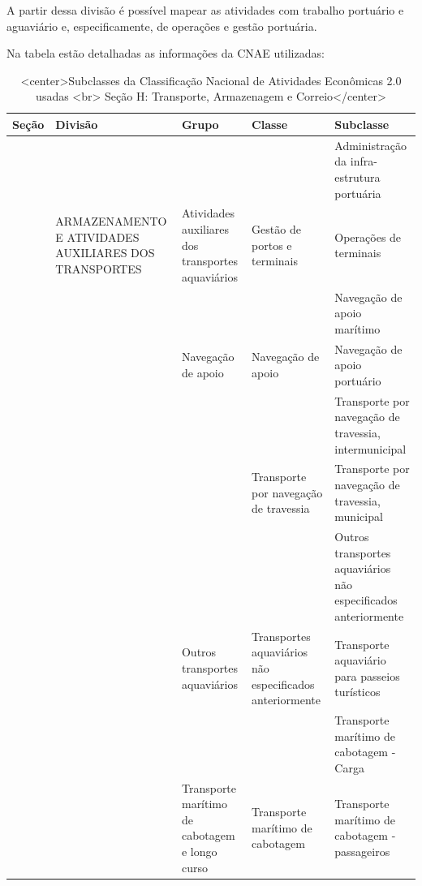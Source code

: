 \documentclass[
]{article}
\begin{document}
A partir dessa divisão é possível mapear as atividades com trabalho
portuário e aguaviário e, especificamente, de operações e gestão
portuária.

Na tabela estão detalhadas as informações da CNAE utilizadas:

\begin{table}

\caption{\label{tab:tabela1}<center>Subclasses da Classificação Nacional de Atividades Econômicas 2.0 usadas <br> Seção H: Transporte, Armazenagem e Correio</center>}
\centering
\begin{tabular}[t]{>{}lllll}
\toprule
Seção & Divisão & Grupo & Classe & Subclasse\\
\midrule
 &  &  &  & Administração da infra-estrutura portuária\\
\cmidrule{5-5}
 & \multirow[t]{-2}{*}{\raggedright\arraybackslash ARMAZENAMENTO E ATIVIDADES AUXILIARES DOS TRANSPORTES} & \multirow[t]{-2}{*}{\raggedright\arraybackslash Atividades auxiliares dos transportes aquaviários} & \multirow[t]{-2}{*}{\raggedright\arraybackslash Gestão de portos e terminais} & Operações de terminais\\
\cmidrule{2-5}
 &  &  &  & Navegação de apoio marítimo\\
\cmidrule{5-5}
 &  & \multirow[t]{-2}{*}{\raggedright\arraybackslash Navegação de apoio} & \multirow[t]{-2}{*}{\raggedright\arraybackslash Navegação de apoio} & Navegação de apoio portuário\\
\cmidrule{3-5}
 &  &  &  & Transporte por navegação de travessia, intermunicipal\\
\cmidrule{5-5}
 &  &  & \multirow[t]{-2}{*}{\raggedright\arraybackslash Transporte por navegação de travessia} & Transporte por navegação de travessia, municipal\\
\cmidrule{4-5}
 &  &  &  & Outros transportes aquaviários não especificados anteriormente\\
\cmidrule{5-5}
 &  & \multirow[t]{-4}{*}{\raggedright\arraybackslash Outros transportes aquaviários} & \multirow[t]{-2}{*}{\raggedright\arraybackslash Transportes aquaviários não especificados anteriormente} & Transporte aquaviário para passeios turísticos\\
\cmidrule{3-5}
 &  &  &  & Transporte marítimo de cabotagem - Carga\\
\cmidrule{5-5}
 &  & \multirow[t]{-2}{*}{\raggedright\arraybackslash Transporte marítimo de cabotagem e longo curso} & \multirow[t]{-2}{*}{\raggedright\arraybackslash Transporte marítimo de cabotagem} & Transporte marítimo de cabotagem - passageiros\\

\end{tabular}
\end{table}
\end{document}
